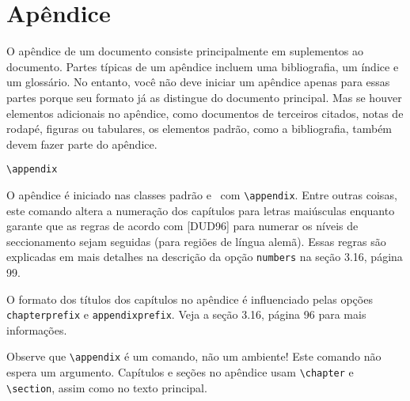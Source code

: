 \chapter{Apêndice}
O apêndice de um documento consiste principalmente em suplementos ao documento. Partes típicas de um apêndice incluem uma bibliografia, um índice e um glossário. No entanto, você não deve iniciar um apêndice apenas para essas partes porque seu formato já as distingue do documento principal. Mas se houver elementos adicionais no apêndice, como documentos de terceiros citados, notas de rodapé, figuras ou tabulares, os elementos padrão, como a bibliografia, também devem fazer parte do apêndice.

\verb|\appendix|

O apêndice é iniciado nas classes padrão e \KOMAScript\ com \verb|\appendix|. Entre outras coisas, este comando altera a numeração dos capítulos para letras maiúsculas enquanto garante que as regras de acordo com [DUD96] para numerar os níveis de seccionamento sejam seguidas (para regiões de língua alemã). Essas regras são explicadas em mais detalhes na descrição da opção \texttt{numbers} na seção 3.16, página 99.

O formato dos títulos dos capítulos no apêndice é influenciado pelas opções \texttt{chap\-ter\-pre\-fix} e \texttt{a\-ppen\-dix\-pre\-fix}. Veja a seção 3.16, página 96 para mais informações.

Observe que \verb|\appendix| é um comando, não um ambiente! Este comando não espera um argumento. Capítulos e seções no apêndice usam \verb|\chapter| e \verb|\section|, assim como no texto principal.
